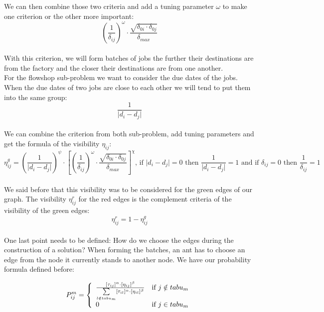 \documentclass[UTF8, twoside]{EPURapport}
\begin{document}
	We can then combine those two criteria and add a tuning parameter $\omega$ to make one criterion or the other more important: 
\\

\[
\left(\frac{1}{\delta_{ij}}\right)^\omega \cdot \frac{\sqrt{\delta_{0i} \cdot \delta_{0j}}}{\delta_{max}}
\]
\\

	With this criterion, we will form batches of jobs the further their destinations are from the factory and the closer their destinations are from one another.
\\

	For the flowshop sub-problem we want to consider the due dates of the jobs. When the due dates of two jobs are close to each other we will tend to put them into the same group: 
\\

\[
\frac{1}{\vert d_i - d_j \vert}
\]
\\

	We can combine the criterion from both sub-problem, add tuning parameters and get the formula of the visibility $\eta_{ij}$:
\\

\[
\eta_{ij}^g = 
\left( \frac{1}{\vert d_i - d_j \vert} \right)^\psi \cdot \left[\left(\frac{1}{\delta_{ij}}\right)^\omega \cdot \frac{\sqrt{\delta_{0i} \cdot \delta_{0j}}}{\delta_{max}} \right]^\chi \text{, if } \vert d_i - d_j \vert = 0 \text{ then } \frac{1}{\vert d_i - d_j \vert} = 1 \text{ and if } \delta_{ij} = 0 \text{ then } \frac{1}{\delta_{ij}} = 1
\]
\\

	We said before that this visibility was to be considered for the green edges of our graph. The visibility $\eta_{ij}^{r}$ for the red edges is the complement criteria of the visibility of the green edges:
\\

\[
\eta_{ij}^{r} = 1 - \eta_{ij}^g
\]
\\
	
	One last point needs to be defined: How do we choose the edges during the construction of a solution? When forming the batches, an ant has to choose an edge from the node it currently stands to another node. We have our probability formula defined before:
	
\[
P^m_{ij}= \left\{ 
\begin{array}{l r}
\frac{[\tau_{ij}]^\alpha \cdot [\eta_{ij}]^\beta}{\underset{l\notin tabu_m}{\sum}[\tau_{il}]^\alpha \cdot [\eta_{il}]^\beta} & \text{if } j\notin tabu_m\\
0 & \text{if } j\in tabu_m
\end{array}
\right.
\]
	
\end{document}
